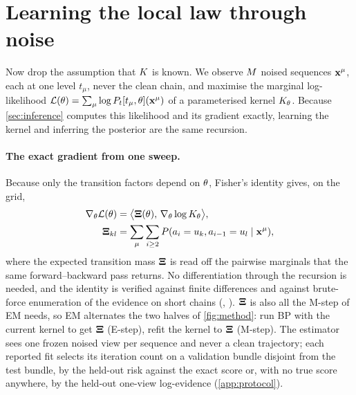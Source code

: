 \section{Learning the local law through noise}
\label{sec:learning}

Now drop the assumption that $K$ is known. We observe $M$ noised sequences
$\mathbf{x}^{\mu}$, each at one level $t_\mu$, never the clean chain, and maximise the marginal
log-likelihood $\mathcal{L}(\theta)=\sum_\mu\log P_t[t_\mu,\theta](\mathbf{x}^\mu)$ of a parameterised kernel
$K_{\theta}$. Because \cref{sec:inference} computes this likelihood and its gradient exactly,
learning the kernel and inferring the posterior are the same recursion.

\paragraph{The exact gradient from one sweep.}
Because only the transition factors depend on $\theta$, Fisher's identity
\citep{cappe2005} gives, on the grid,
\begin{equation}
\begin{aligned}
  \nabla_\theta\mathcal{L}(\theta)&=\bigl\langle\mathbf{\Xi}(\theta),\,\nabla_\theta\log K_{\theta}\bigr\rangle,\\
  \mathbf{\Xi}_{kl}&=\sum_{\mu}\sum_{i\ge2}P(a_i=u_{k},a_{i-1}=u_{l}\mid\mathbf{x}^\mu),
\end{aligned}
\label{eq:fisher}
\end{equation}
where the expected transition mass $\mathbf{\Xi}$ is read off the pairwise marginals that the same
forward--backward pass returns. No differentiation through the recursion is needed, and the identity
is verified against finite differences and against brute-force enumeration of the evidence on short
chains (, ). $\mathbf{\Xi}$ is also all
the M-step of EM needs, so EM alternates the two halves of \cref{fig:method}: run BP with the current
kernel to get $\mathbf{\Xi}$ (E-step), refit the kernel to $\mathbf{\Xi}$ (M-step). The estimator sees one frozen
noised view per sequence and never a clean trajectory; each reported fit selects its iteration
count on a validation bundle disjoint from the test bundle, by the held-out risk against the exact score
or, with no true score anywhere, by the held-out one-view log-evidence (\cref{app:protocol}).

